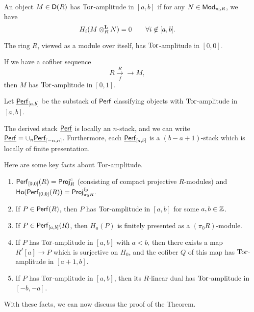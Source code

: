 \documentclass{amsart}
\begin{document}
\begin{dfn}
	An object $M \in \mathsf{D}(R)$ has $\operatorname{Tor}$-amplitude in $[a, b]$ if for any $N \in \mathsf{Mod}_{\pi_0 R}$, we have
	\[
		H_i(M \otimes^{\mathbf{L}}_R N) = 0 \hspace{2em} \forall i \not\in [a, b].
	\]
\end{dfn}

\begin{ex}
	The ring $R$, viewed as a module over itself, has $\operatorname{Tor}$-amplitude in $[0, 0]$.
\end{ex}

\begin{ex}
	If we have a cofiber sequence
	\[
		R \xrightarrow[f] R \to M,
	\]
	then $M$ has $\operatorname{Tor}$-amplitude in $[0, 1]$.
\end{ex}

Let $\underline{\mathsf{Perf}}_{[a,b]}$ be the substack of $\mathsf{Perf}$ classifying objects with $\operatorname{Tor}$-amplitude in $[a, b]$.

\begin{thm}[To\"en-Vaqui\'e]
	The derived stack $\underline{\mathsf{Perf}}$ is locally an $n$-stack, and we can write $\underline{\mathsf{Perf}} = \cup_n \underline{\mathsf{Perf}}_{[-n, n]}$.
	Furthermore, each $\underline{\mathsf{Perf}}_{[a,b]}$ is a $(b - a + 1)$-stack which is locally of finite presentation.
\end{thm}

Here are some key facts about $\operatorname{Tor}$-amplitude.

\begin{enumerate}
	\item $\mathsf{Perf}_{[0,0]}(R) = \mathsf{Proj}_R^c$ (consisting of compact projective $R$-modules) and $\mathsf{Ho}(\mathsf{Perf}_{[0,0]}(R)) = \mathsf{Proj}_{\pi_0 R}^{\mathrm{fp}}$.
	\item If $P \in \mathsf{Perf}(R)$, then $P$ has $\operatorname{Tor}$-amplitude in $[a,b]$ for some $a, b \in \mathbb{Z}$.
	\item If $P \in \mathsf{Perf}_{[a,b]}(R)$, then $H_a(P)$ is finitely presented as a $(\pi_0 R)$-module.
	\item If $P$ has $\operatorname{Tor}$-amplitude in $[a, b]$ with $a < b$, then there exists a map $R^I[a] \to P$ which is surjective on $H_0$, and the cofiber $Q$ of this map has $\operatorname{Tor}$-amplitude in $[a+1, b]$.
	\item If $P$ has $\operatorname{Tor}$-amplitude in $[a, b]$, then its $R$-linear dual has $\operatorname{Tor}$-amplitude in $[-b, -a]$.
\end{enumerate}

With these facts, we can now discuss the proof of the Theorem.
\end{document}
